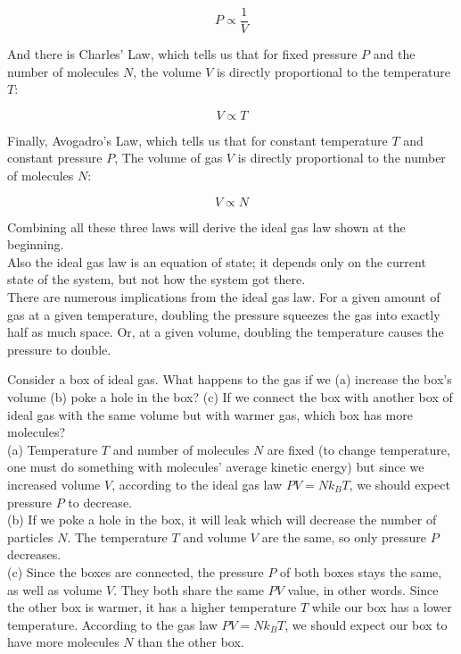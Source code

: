 $$P \propto \frac{1}{V}$$

And there is Charles' Law, which tells us that for fixed pressure $P$ and the number of molecules $N$, the volume $V$ is directly proportional to the temperature $T$:

$$V \propto T$$

Finally,  Avogadro's Law, which tells us that for constant temperature $T$ and constant pressure $P$, The volume of gas $V$ is directly proportional to the number of molecules $N$:

$$V \propto N$$

Combining all these three laws will derive the ideal gas law shown at the beginning. \\

Also the ideal gas law is an equation of state; it depends only on the current state of the system, but not how the system got there. \\

There are numerous implications from the ideal gas law. For a given amount of gas at a given temperature, doubling the pressure squeezes the gas into exactly half as much space. Or, at a given volume, doubling the temperature causes the pressure to double.

\begin{texample}
	Consider a box of ideal gas. What happens to the gas if we (a) increase the box's volume (b) poke a hole in the box? (c) If we connect the box with another box of ideal gas with the same volume but with warmer gas, which box has more molecules? \\
	
	(a) Temperature $T$ and number of molecules $N$ are fixed (to change temperature, one must do something with molecules' average kinetic energy) but since we increased volume $V$, according to the ideal gas law $PV=Nk_B T$, we should expect pressure $P$ to decrease. \\
	
	(b) If we poke a hole in the box, it will leak which will decrease the number of particles $N$. The temperature $T$ and volume $V$ are the same, so only pressure $P$ decreases. \\
	
	(c) Since the boxes are connected, the pressure $P$ of both boxes stays the same, as well as volume $V$. They both share the same $PV$ value, in other words. Since the other box is warmer, it has a higher temperature $T$ while our box has a lower temperature. According to the gas law $PV=Nk_B T$, we should expect our box to have more molecules $N$ than the other box.
\end{texample}

